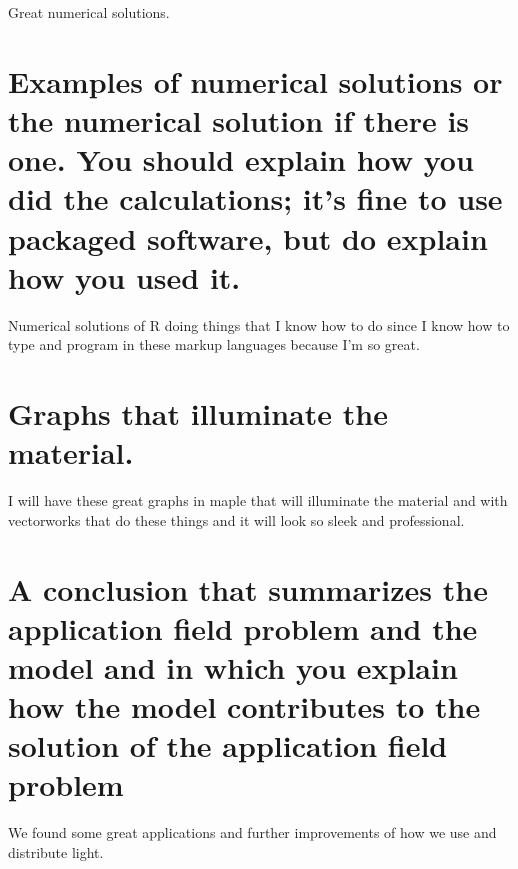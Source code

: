 Great numerical solutions. 

\section{Examples of numerical solutions or the numerical solution if there is one. You should explain how you did the calculations; it’s fine to use packaged software, but do explain how you used it.} 
Numerical solutions of R doing things that I know how to do since I know how to type and program in these markup languages because I'm so great. 

\section{Graphs that illuminate the material.}
I will have these great graphs in maple that will illuminate the material and with vectorworks that do these things and it will look so sleek and professional. 

\section{A conclusion that summarizes the application field problem and the model and in which you explain how the model contributes to the solution of the application field problem} 

We found some great applications and further improvements of how we use and distribute light. 



